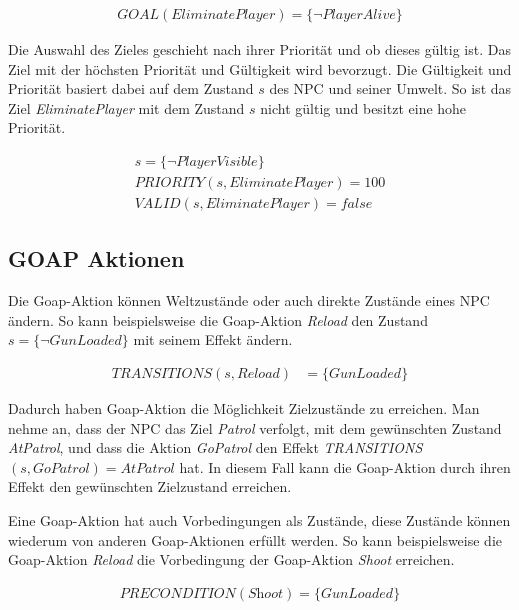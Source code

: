 \begin{align}
	\textit{GOAL}(\textit{EliminatePlayer}) = \{\lnot \textit{PlayerAlive}\}
\end{align}


Die Auswahl des Zieles geschieht nach ihrer Priorität und ob dieses gültig ist. Das Ziel mit der höchsten Priorität und Gültigkeit wird bevorzugt. Die Gültigkeit und Priorität basiert dabei auf dem Zustand $s$ des NPC und seiner Umwelt. So ist das Ziel \textit{EliminatePlayer} mit dem Zustand $s$ nicht gültig und besitzt eine hohe Priorität.

\begin{align}
	s = \{\lnot \textit{PlayerVisible}\} \\
	\textit{PRIORITY}(s,\textit{EliminatePlayer}) = 100 \\
	\textit{VALID}(s,\textit{EliminatePlayer}) = \textit{false}
\end{align}


\subsection{GOAP Aktionen}
\label{chap:goap actions}

Die Goap-Aktion können Weltzustände oder auch direkte Zustände eines NPC ändern. So kann beispielsweise die Goap-Aktion \textit{Reload} den Zustand $s = \{\lnot \textit{GunLoaded}\}$ mit seinem Effekt ändern.

\begin{align}
	\textit{TRANSITIONS}(s,\textit{Reload}) &= \{\textit{GunLoaded}\}
\end{align}


Dadurch haben Goap-Aktion die Möglichkeit Zielzustände zu erreichen. Man nehme an, dass der NPC das Ziel \textit{Patrol} verfolgt, mit dem gewünschten Zustand \textit{AtPatrol}, und dass die Aktion \textit{GoPatrol} den Effekt \textit{TRANSITIONS}$(s, \textit{GoPatrol}) = {\textit{AtPatrol}}$ hat. In diesem Fall kann die Goap-Aktion durch ihren Effekt den gewünschten Zielzustand erreichen.

Eine Goap-Aktion hat auch Vorbedingungen als Zustände, diese Zustände können wiederum von anderen Goap-Aktionen erfüllt werden. So kann beispielsweise die Goap-Aktion \textit{Reload} die Vorbedingung der Goap-Aktion \textit{Shoot} erreichen.

\begin{align}
	\textit{PRECONDITION}(\textit{Shoot}) = \{\textit{GunLoaded}\}
\end{align}

